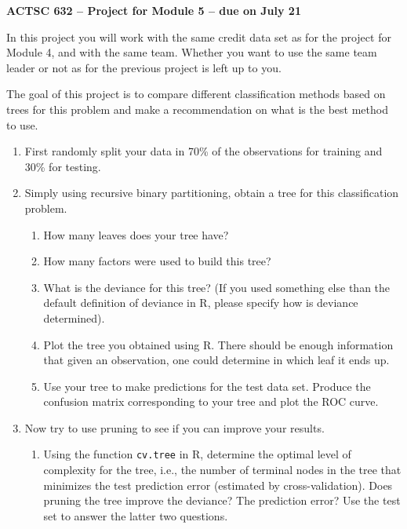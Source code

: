 \documentclass[11pt]{article}
\begin{document}
\begin{center}
{\large \bf ACTSC 632 -- Project for Module 5 -- due on July 21} \\

\end{center}

In this project you will work with the same credit data set as for the project for Module 4, and with the same team. Whether you want to use the same team leader or not as for the previous project is left up to you. 

The goal of this project is to compare different classification methods based on  trees for this problem and make a recommendation on what is the best method to use.


\begin{enumerate}
  \item First randomly split your data in 70\% of the observations for training and 30\% for testing.
\item Simply using recursive binary partitioning, obtain a tree for this classification problem.
  \begin{enumerate}
  \item How many leaves does your tree have?
    \item How many factors were used to build this tree?
  \item What is the deviance for this tree? (If you used something else than the default definition of deviance in R, please specify how is deviance determined).
  \item Plot the tree you obtained using R. There should be enough information that given an observation, one could determine in which leaf it ends up. %
    \item Use your tree to make predictions for the test data set. Produce the confusion matrix corresponding to your tree and plot the ROC curve.
  \end{enumerate}
\item Now try to use pruning to see if you can improve your results.
  \begin{enumerate}
  \item Using the function {\tt cv.tree} in R,  determine the optimal level of complexity for the tree, i.e., the number of terminal nodes in the tree that minimizes the test prediction error (estimated by cross-validation). Does pruning the tree improve the deviance? The prediction error? Use the test set to answer the latter two questions.

\end{enumerate}
\end{enumerate}
\end{document}
